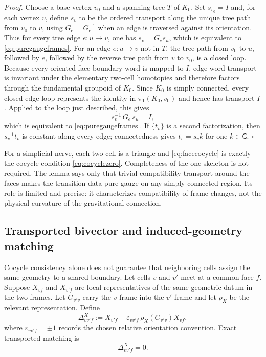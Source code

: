 \documentclass[aps,prd,reprint,nofootinbib,superscriptaddress]{revtex4-2}
\begin{document}
\emph{Proof.}
Choose a base vertex $v_0$ and a spanning tree $T$ of $K_0$. Set $s_{v_0}=I$ and, for each vertex $v$, define $s_v$ to be the ordered transport along the unique tree path from $v_0$ to $v$, using $G_{\bar e}=G_e^{-1}$ when an edge is traversed against its orientation. Thus for every tree edge $e:u\to v$, one has $s_v=G_e s_u$, which is equivalent to \eqref{eq:puregaugeframes}. For an edge $e:u\to v$ not in $T$, the tree path from $v_0$ to $u$, followed by $e$, followed by the reverse tree path from $v$ to $v_0$, is a closed loop. Because every oriented face-boundary word is mapped to $I$, edge-word transport is invariant under the elementary two-cell homotopies and therefore factors through the fundamental groupoid of $K_0$. Since $K_0$ is simply connected, every closed edge loop represents the identity in $\pi_1(K_0,v_0)$ and hence has transport $I$. Applied to the loop just described, this gives
\begin{equation}
s_v^{-1}\,G_e\,s_u=I,
\end{equation}
which is equivalent to \eqref{eq:puregaugeframes}. If $\{t_v\}$ is a second factorization, then $s_v^{-1}t_v$ is constant along every edge; connectedness gives $t_v=s_v k$ for one $k\in\mathsf G$. \hfill$\square$

For a simplicial nerve, each two-cell is a triangle and \eqref{eq:facecocycle} is exactly the cocycle condition \eqref{eq:cocyclezero}. Completeness of the one-skeleton is not required. The lemma says only that trivial compatibility transport around the faces makes the transition data pure gauge on any simply connected region. Its role is limited and precise: it characterizes compatibility of frame changes, not the physical curvature of the gravitational connection.

\subsection{Transported bivector and induced-geometry matching}

Cocycle consistency alone does not guarantee that neighboring cells assign the same geometry to a shared boundary. Let cells $v$ and $v'$ meet at a common face $f$. Suppose $X_{vf}$ and $X_{v'f}$ are local representatives of the same geometric datum in the two frames. Let $G_{v'v}$ carry the $v$ frame into the $v'$ frame and let $\rho_X$ be the relevant representation. Define
\begin{equation}
\Delta^X_{vv'f}
:=
X_{v'f}
-
\varepsilon_{vv'f}\,\rho_X(G_{v'v})X_{vf},
\label{eq:Xdefect}
\end{equation}
where $\varepsilon_{vv'f}=\pm1$ records the chosen relative orientation convention. Exact transported matching is
\begin{equation}
\boxed{\Delta^X_{vv'f}=0.}
\label{eq:Xmatch}
\end{equation}
\end{document}
